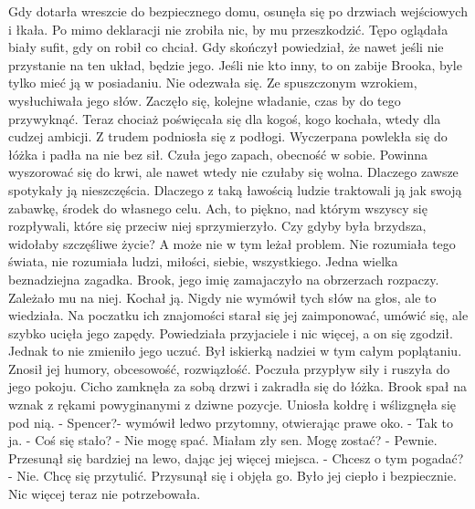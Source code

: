 \documentclass[12pt,a4paper]{book}
\begin{document}
Gdy dotarła wreszcie do bezpiecznego domu, osunęła się po drzwiach wejściowych i łkała. Po mimo deklaracji nie zrobiła nic, by mu przeszkodzić. Tępo oglądała biały sufit, gdy on robił co chciał. Gdy skończył powiedział, że nawet jeśli nie przystanie na ten układ, będzie jego. Jeśli nie kto inny, to on zabije Brooka, byle tylko mieć ją w posiadaniu. Nie odezwała się. Ze spuszczonym wzrokiem, wysłuchiwała jego słów. Zaczęło się, kolejne władanie, czas by do tego przywyknąć. Teraz chociaż poświęcała się dla kogoś, kogo kochała, wtedy dla cudzej ambicji. 
Z trudem podniosła się z podłogi. Wyczerpana powlekła się do łóżka i padła na nie bez sił. Czuła jego zapach, obecność w sobie. Powinna wyszorować się do krwi, ale nawet wtedy nie czułaby się wolna. Dlaczego zawsze spotykały ją nieszczęścia. Dlaczego z taką ławością ludzie traktowali ją jak swoją zabawkę, środek do własnego celu. Ach, to piękno, nad którym wszyscy się rozpływali, które się przeciw niej sprzymierzyło. Czy gdyby była brzydsza, widołaby szczęśliwe życie? A może nie w tym leżał problem. Nie rozumiała tego świata, nie rozumiała ludzi, miłości, siebie, wszystkiego. Jedna wielka beznadziejna zagadka. 
Brook, jego imię zamajaczyło na obrzerzach rozpaczy. Zależało mu na niej. Kochał ją. Nigdy nie wymówił tych słów na głos, ale to wiedziała. Na poczatku ich znajomości starał się jej zaimponować, umówić się, ale szybko ucięła jego zapędy. Powiedziała przyjaciele i nic więcej, a on się zgodził. Jednak to nie zmieniło jego uczuć. Był iskierką nadziei w tym całym poplątaniu. Znosił jej humory, obcesowość, rozwiązłość. Poczuła przypływ siły i ruszyła do jego pokoju. Cicho zamknęła za sobą drzwi i zakradła się do łóżka. Brook spał na wznak z rękami powyginanymi z dziwne pozycje. Uniosła kołdrę i wślizgnęła się pod nią. 
- Spencer?- wymówił ledwo przytomny, otwierając prawe oko. 
- Tak to ja. 
- Coś się stało?
- Nie mogę spać. Miałam zły sen. Mogę zostać?
- Pewnie. 
Przesunął się bardziej na lewo, dając jej więcej miejsca. 
- Chcesz o tym pogadać?
- Nie. Chcę się przytulić. 
Przysunął się i objęła go. Było jej ciepło i bezpiecznie. Nic więcej teraz nie potrzebowała.
\end{document}
